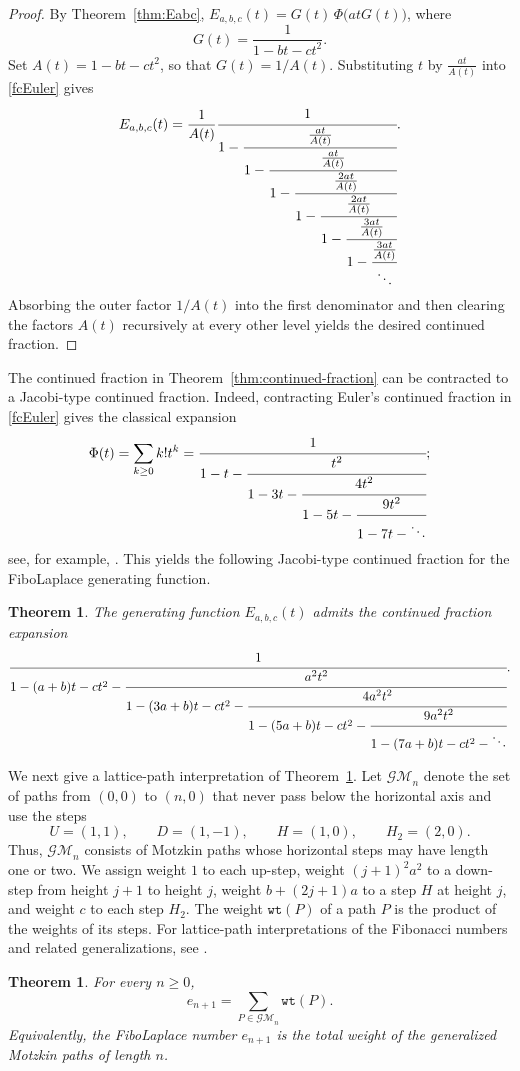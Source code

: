 \documentclass[11pt]{amsart}
\newcommand{\wt}{{\texttt{wt}}}
\theoremstyle{plain}
\numberwithin{equation}{section}
\newtheorem{theorem}[thm]{Theorem}
\begin{document}
\begin{proof}
By Theorem~\ref{thm:Eabc},  $E_{a,b,c}(t) =
G(t)\,\Phi\bigl(atG(t)\bigr)$, where
\[
G(t)=\frac{1}{1-bt-ct^2}.
\]
Set $A(t)=1-bt-ct^2$, so that $G(t)=1/A(t)$. Substituting $t$ by $\frac{at}{A(t)}$ into \eqref{fcEuler} gives
\[
E_{a,b,c}(t)
=
\frac{1}{A(t)}
\cfrac{1}{
1-\cfrac{\frac{at}{A(t)}}{
1-\cfrac{\frac{at}{A(t)}}{
1-\cfrac{\frac{2at}{A(t)}}{
1-\cfrac{\frac{2at}{A(t)}}{
1-\cfrac{\frac{3at}{A(t)}}{
1-\cfrac{\frac{3at}{A(t)}}{\ddots}}}}}}}.
\]
Absorbing the outer factor $1/A(t)$ into the first denominator and
then clearing the factors $A(t)$ recursively at every other level
yields  the desired continued fraction.
\end{proof}

The continued fraction in Theorem~\ref{thm:continued-fraction} can be
contracted to a Jacobi-type continued fraction. Indeed, contracting
Euler's continued fraction in \eqref{fcEuler} gives the classical
expansion
\[
\Phi(t)=\sum_{k\geq 0}k!t^k
=
\cfrac{1}{
1-t-
\cfrac{t^2}{
1-3t-
\cfrac{4t^2}{
1-5t-
\cfrac{9t^2}{
1-7t-\ddots
}
}
}
};
\]
see, for example, \cite{Flajolet}. This yields the following
Jacobi-type continued fraction for the FiboLaplace generating
function.

\begin{theorem}\label{thm:contracted-cf}
The generating function $E_{a,b,c}(t)$ admits
the continued fraction expansion
\[
\cfrac{1}{
1-(a+b)t-ct^2-
\cfrac{a^2t^2}{
1-(3a+b)t-ct^2-
\cfrac{4a^2t^2}{
1-(5a+b)t-ct^2-
\cfrac{9a^2t^2}{
1-(7a+b)t-ct^2-\ddots
}
}
}
}.
\]
\end{theorem}

We next give a lattice-path interpretation of
Theorem~\ref{thm:contracted-cf}. Let $\mathcal{GM}_n$ denote the set of
paths from $(0,0)$ to $(n,0)$ that never pass below the horizontal axis
and use the steps
\[
U=(1,1),\qquad D=(1,-1),\qquad H=(1,0),\qquad H_2=(2,0).
\]
Thus, $\mathcal{GM}_n$ consists of Motzkin paths whose horizontal steps
may have length one or two. We assign weight $1$ to each up-step, weight
$(j+1)^2a^2$ to a down-step from height $j+1$ to height $j$, weight
$b+(2j+1)a$ to a step $H$ at height $j$, and weight $c$ to each step
$H_2$. The weight $\wt(P)$ of a path $P$ is the product of the weights
of its steps. For lattice-path interpretations of the Fibonacci numbers
and related generalizations, see \cite{CheonKimShapiro,RamirezSirventkBonacci}.



\begin{theorem}\label{thm:motzkin-interpretation}
For every $n\geq 0$,
\[
e_{n+1}
=
\sum_{P\in\mathcal{GM}_n}\wt(P).
\]
Equivalently, the FiboLaplace number $e_{n+1}$ is the total weight of
the generalized Motzkin paths of  length $n$.
\end{theorem}
\end{document}
